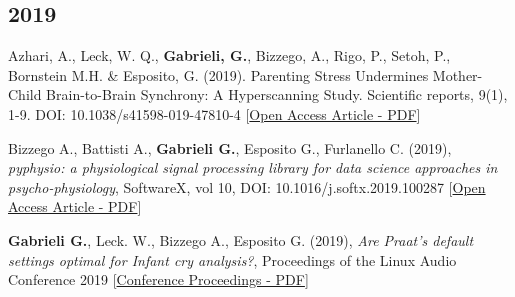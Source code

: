 \documentclass[a4paper]{deedy-resume} %
\begin{document}
\begin{minipage}[t]{0.63\textwidth}
\begin{tightitemize}
		
			
		    
	    
	    \sectionspace
	    \subsection{2019}
			\item Azhari, A., Leck, W. Q., \textbf{Gabrieli, G.}, Bizzego, A., Rigo, P., Setoh, P., Bornstein M.H. \& Esposito, G. (2019). Parenting Stress Undermines Mother-Child Brain-to-Brain Synchrony: A Hyperscanning Study. Scientific reports, 9(1), 1-9. DOI: 10.1038/s41598-019-47810-4  [\href{https://www.nature.com/articles/s41598-019-47810-4}{Open Access Article - PDF}]
			
			\item Bizzego A., Battisti A., \textbf{Gabrieli G.}, Esposito G., Furlanello C. (2019), \textit{pyphysio: a physiological signal processing library for data science approaches in psycho-physiology}, SoftwareX, vol 10, DOI: 10.1016/j.softx.2019.100287 [\href{https://www.sciencedirect.com/science/article/pii/S2352711019301839}{Open Access Article - PDF}]
			
	        \item \textbf{Gabrieli G.}, Leck. W., Bizzego A., Esposito G. (2019),\textit{ Are Praat's default settings optimal for Infant cry analysis?}, Proceedings of the Linux Audio Conference 2019    [\href{http://lac.linuxaudio.org/2019/doc/gabrieli.pdf}{Conference Proceedings - PDF}]
	    

\end{tightitemize}
\end{minipage}
\end{document}
